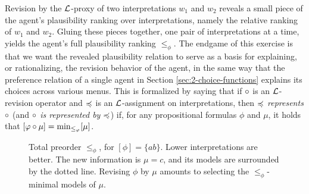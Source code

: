 Revision by the $\mathcal{L}$-proxy of two interpretations $w_1$ and $w_2$ 
reveals a small piece of the agent's plausibility ranking over interpretations,
namely the relative ranking of $w_1$ and $w_2$. 
Gluing these pieces together, one pair of interpretations at a time,
yields the agent's full plausibility ranking $\le_{\phi}$.
The endgame of this exercise is that we want the revealed plausibility 
relation to serve as a basis for explaining, 
or rationalizing, the revision behavior of the agent,
in the same way that the preference relation of a single agent
in Section \ref{sec:2-choice-functions} explains its choices across various menus.
This is formalized by saying that 
if $\circ$ is an $\mathcal{L}$-revision operator and 
$\preccurlyeq$ is an $\mathcal{L}$-assignment on interpretations,
then \emph{$\preccurlyeq$ represents $\circ$}
(and \emph{$\circ$ is represented by $\preccurlyeq$})
if, for any propositional formulas $\phi$ and $\mu$,
it holds that $[\varphi\circ\mu] = {\operatorname{min}}_{\le_\varphi}[\mu]$. 

\begin{figure}\centering
	\caption{
		Total preorder $\le_\phi$, for $[\phi]=\{ab\}$.
		Lower interpretations are better.
		The new information is $\mu = c$,
		and its models are surrounded by the dotted line.
		Revising $\phi$ by $\mu$ amounts to selecting the 
		$\le_\phi$-minimal models of $\mu$.
	}
	\label{fig:3-revision-preorder-operator-interplay}
\end{figure}

